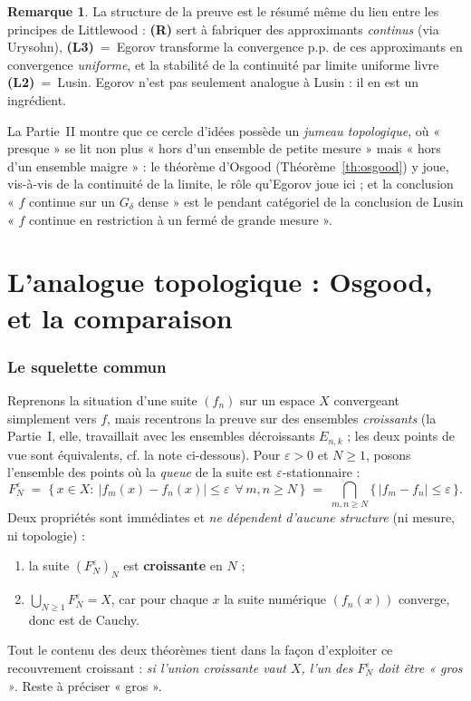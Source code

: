\documentclass[11pt,a4paper]{article}
\theoremstyle{plain}
\theoremstyle{definition}
\newtheorem{remarque}{Remarque}
\newcommand{\1}{\mathbf{1}}
\newcommand{\abs}[1]{\left|#1\right|}
\begin{document}
\begin{remarque}
La structure de la preuve est le résumé même du lien entre les principes de
Littlewood : \textbf{(R)} sert à fabriquer des approximants \emph{continus} (via
Urysohn), \textbf{(L3)}~=~Egorov transforme la convergence p.p. de ces approximants
en convergence \emph{uniforme}, et la stabilité de la continuité par limite uniforme
livre \textbf{(L2)}~=~Lusin. Egorov n'est pas seulement analogue à Lusin : il en est
un ingrédient.
\end{remarque}

La Partie~II montre que ce cercle d'idées possède un \emph{jumeau topologique}, où
« presque » se lit non plus « hors d'un ensemble de petite mesure » mais « hors d'un
ensemble maigre » : le théorème d'Osgood (Théorème~\ref{th:osgood}) y joue, vis-à-vis
de la continuité de la limite, le rôle qu'Egorov joue ici ; et la conclusion « $f$
continue sur un $G_\delta$ dense » est le pendant catégoriel de la conclusion de
Lusin « $f$ continue en restriction à un fermé de grande mesure ».

\part{L'analogue topologique : Osgood, et la comparaison}

\section{Le squelette commun}

Reprenons la situation d'une suite $(f_n)$ sur un espace $X$ convergeant simplement
vers $f$, mais recentrons la preuve sur des ensembles \emph{croissants} (la
Partie~I, elle, travaillait avec les ensembles décroissants $E_{n,k}$ ; les deux
points de vue sont équivalents, cf. la note ci-dessous). Pour $\varepsilon>0$ et
$N\ge1$, posons l'ensemble des points où la \emph{queue} de la suite est
$\varepsilon$-stationnaire :
\[
  F_N^{\varepsilon}
  \;=\;\bigl\{\,x\in X:\ \abs{f_m(x)-f_n(x)}\le\varepsilon\ \ \forall\, m,n\ge N\,\bigr\}
  \;=\;\bigcap_{m,n\ge N}\bigl\{\,\abs{f_m-f_n}\le\varepsilon\,\bigr\}.
\]
Deux propriétés sont immédiates et \emph{ne dépendent d'aucune structure} (ni
mesure, ni topologie) :
\begin{enumerate}[label=(\roman*),nosep,topsep=2pt]
\item la suite $(F_N^{\varepsilon})_N$ est \textbf{croissante} en $N$ ;
\item $\displaystyle\bigcup_{N\ge1}F_N^{\varepsilon}=X$, car pour chaque $x$ la
      suite numérique $(f_n(x))$ converge, donc est de Cauchy.
\end{enumerate}
Tout le contenu des deux théorèmes tient dans la façon d'exploiter ce recouvrement
croissant : \emph{si l'union croissante vaut $X$, l'un des $F_N^{\varepsilon}$ doit
être « gros »}. Reste à préciser « gros ».
\end{document}
